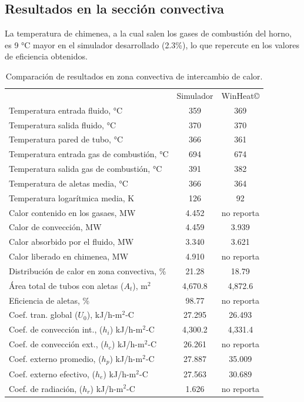\subsection{Resultados en la sección convectiva}
\par La temperatura de chimenea, a la cual salen los gases de combustión del horno, es 9 °C mayor en el simulador desarrollado (2.3\%), lo que repercute en los valores de eficiencia obtenidos.
\begin{table}[H]\begin{center}
\caption[Resultados en zona convectiva de intercambio de calor]{Comparación de resultados en zona convectiva de intercambio de calor.}
\label{tbl:compara-zc}
\begin{tabular}{l|c|c}
	& Simulador & WinHeat\copyright \\
Temperatura entrada fluido, °C		& 359 & 369	\\
Temperatura salida fluido, °C		& 370 & 370	\\
Temperatura pared de tubo, °C		& 366 & 361	\\
Temperatura entrada gas de combustión, °C			& 694 & 674	\\
Temperatura salida gas de combustión, °C			& 391 & 382	\\
Temperatura de aletas media, °C     & 366 & 364\\
Temperatura logarítmica media, K	& 126 & 92 \\

Calor contenido en los gasaes, MW   & 4.452 & no reporta \\
Calor de convección, MW			    & 4.459 & 3.939	\\
Calor absorbido por el fluido, MW	& 3.340 & 3.621	\\
Calor liberado en chimenea, MW	    & 4.910 & no reporta \\

Distribución de calor en zona convectiva, \%& 21.28 &  18.79 \\

Área total de tubos con aletas ($A_t$), m$^2$& 4,670.8 & 4,872.6 \\
Eficiencia de aletas, \%			& 98.77 & no reporta \\

Coef. tran. global ($U_0$), kJ/h-m$^2$-C	& 27.295 & 26.493 \\
Coef. de convección int., ($h_i$) kJ/h-m$^2$-C	& 4,300.2 & 4,331.4 \\
Coef. de convección ext., ($h_c$) kJ/h-m$^2$-C	& 26.261 & no reporta \\
Coef. externo promedio, ($h_p$) kJ/h-m$^2$-C	& 27.887 & 35.009 \\
Coef. externo efectivo, ($h_e$) kJ/h-m$^2$-C	& 27.563 & 30.689 \\
Coef. de radiación, ($h_r$) kJ/h-m$^2$-C	& 1.626  & no reporta \\


\end{tabular}
\end{center}
\end{table}
